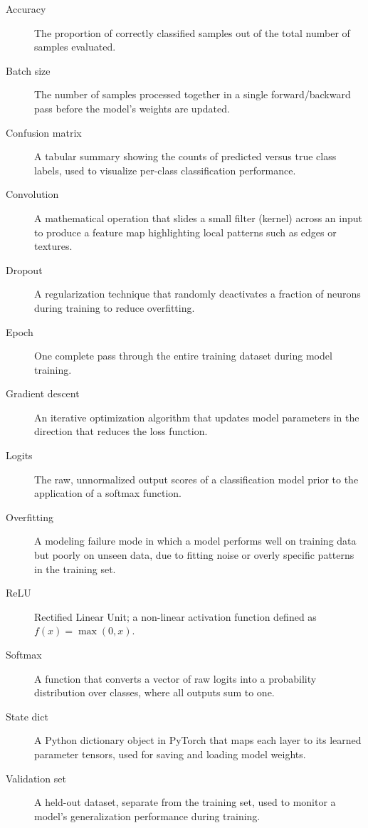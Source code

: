 \documentclass[12pt,a4paper]{report}
\begin{document}
\begin{description}
    \item[Accuracy] The proportion of correctly classified samples out of the total number of samples evaluated.
    \item[Batch size] The number of samples processed together in a single forward/backward pass before the model's weights are updated.
    \item[Confusion matrix] A tabular summary showing the counts of predicted versus true class labels, used to visualize per-class classification performance.
    \item[Convolution] A mathematical operation that slides a small filter (kernel) across an input to produce a feature map highlighting local patterns such as edges or textures.
    \item[Dropout] A regularization technique that randomly deactivates a fraction of neurons during training to reduce overfitting.
    \item[Epoch] One complete pass through the entire training dataset during model training.
    \item[Gradient descent] An iterative optimization algorithm that updates model parameters in the direction that reduces the loss function.
    \item[Logits] The raw, unnormalized output scores of a classification model prior to the application of a softmax function.
    \item[Overfitting] A modeling failure mode in which a model performs well on training data but poorly on unseen data, due to fitting noise or overly specific patterns in the training set.
    \item[ReLU] Rectified Linear Unit; a non-linear activation function defined as $f(x) = \max(0, x)$.
    \item[Softmax] A function that converts a vector of raw logits into a probability distribution over classes, where all outputs sum to one.
    \item[State dict] A Python dictionary object in PyTorch that maps each layer to its learned parameter tensors, used for saving and loading model weights.
    \item[Validation set] A held-out dataset, separate from the training set, used to monitor a model's generalization performance during training.
\end{description}
\end{document}
